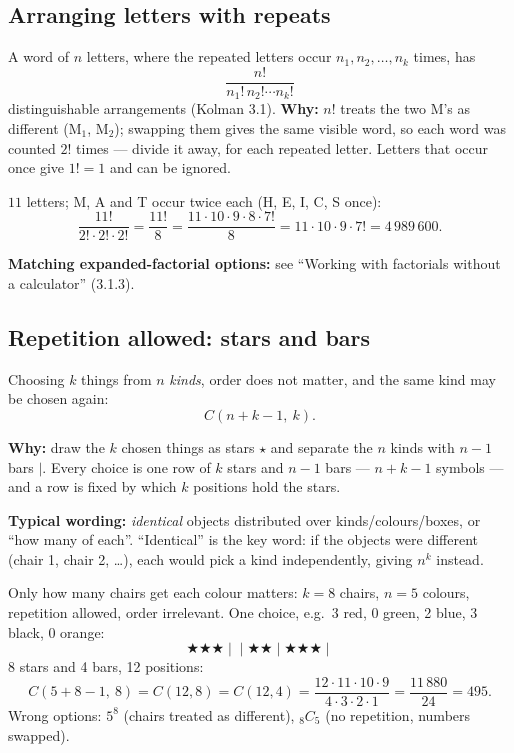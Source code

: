\documentclass{fkt-notes}
\theoremstyle{definition}
\begin{document}
\subsection{Arranging letters with repeats}
%
\begin{rulepar}
  A word of $n$ letters, where the repeated letters occur
  $n_1, n_2, \ldots, n_k$ times, has
  \[
    \frac{n!}{n_1! \, n_2! \cdots n_k!}
  \]
  distinguishable arrangements (Kolman 3.1). \textbf{Why:} $n!$ treats
  the two M's as different (M$_1$, M$_2$); swapping them gives the same
  visible word, so each word was counted $2!$ times --- divide it away,
  for each repeated letter. Letters that occur once give $1! = 1$ and
  can be ignored.
\end{rulepar}

\begin{example}[MATHEMATICS]
  $11$ letters; M, A and T occur twice each (H, E, I, C, S once):
  \[
    \frac{11!}{2! \cdot 2! \cdot 2!} = \frac{11!}{8}
    = \frac{11 \cdot 10 \cdot 9 \cdot 8 \cdot 7!}{8}
    = 11 \cdot 10 \cdot 9 \cdot 7! = 4\,989\,600.
  \]
\end{example}

\noindent \textbf{Matching expanded-factorial options:} see
``Working with factorials without a calculator'' (3.1.3).

\subsection{Repetition allowed: stars and bars}
%
\begin{rulepar}
  Choosing $k$ things from $n$ \emph{kinds}, order does not matter, and
  the same kind may be chosen again:
  \[
    C(n + k - 1,\ k).
  \]
\end{rulepar}
\textbf{Why:} draw the $k$ chosen things as stars $\star$ and separate
the $n$ kinds with $n - 1$ bars $|$. Every choice is one row of $k$
stars and $n - 1$ bars --- $n + k - 1$ symbols --- and a row is fixed
by which $k$ positions hold the stars.

\noindent \textbf{Typical wording:} \emph{identical} objects
distributed over kinds/colours/boxes, or ``how many of each''.
``Identical'' is the key word: if the objects were different
(chair 1, chair 2, \ldots), each would pick a kind independently,
giving $n^k$ instead.

\begin{example}
  Only how many chairs get each colour matters: $k = 8$ chairs,
  $n = 5$ colours, repetition allowed, order irrelevant. One choice,
  e.g.\ 3 red, 0 green, 2 blue, 3 black, 0 orange:
  \[
    \bigstar\bigstar\bigstar \;\big|\; \;\big|\; \bigstar\bigstar \;\big|\; \bigstar\bigstar\bigstar \;\big|\;
  \]
  8 stars and 4 bars, 12 positions:
  \[
    C(5 + 8 - 1,\ 8) = C(12, 8) = C(12, 4)
    = \frac{12 \cdot 11 \cdot 10 \cdot 9}{4 \cdot 3 \cdot 2 \cdot 1}
    = \frac{11\,880}{24} = 495.
  \]
  Wrong options: $5^8$ (chairs treated as different), ${}_8C_5$ (no
  repetition, numbers swapped).
\end{example}
\end{document}
